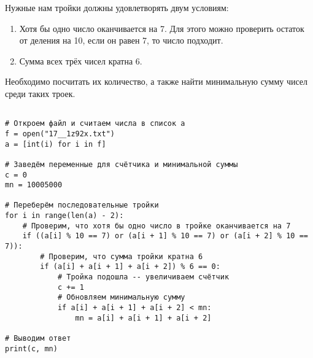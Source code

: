 \documentclass[14pt,a4paper]{article}
\begin{document}
Нужные нам тройки должны удовлетворять двум условиям:
\begin{enumerate}
    \item Хотя бы одно число оканчивается на 7. Для этого можно проверить остаток от деления на 10, если он равен 7, то число подходит. \\
    \item Сумма всех трёх чисел кратна 6. \\
\end{enumerate}
Необходимо посчитать их количество, а также найти минимальную сумму чисел среди таких троек.

\begin{verbatim}

# Откроем файл и считаем числа в список a
f = open("17__1z92x.txt")
a = [int(i) for i in f]

# Заведём переменные для счётчика и минимальной суммы
c = 0
mn = 10005000

# Переберём последовательные тройки
for i in range(len(a) - 2):
    # Проверим, что хотя бы одно число в тройке оканчивается на 7
    if ((a[i] % 10 == 7) or (a[i + 1] % 10 == 7) or (a[i + 2] % 10 == 7)):
        # Проверим, что сумма тройки кратна 6
        if (a[i] + a[i + 1] + a[i + 2]) % 6 == 0:
            # Тройка подошла -- увеличиваем счётчик
            c += 1
            # Обновляем минимальную сумму
            if a[i] + a[i + 1] + a[i + 2] < mn:
                mn = a[i] + a[i + 1] + a[i + 2]

# Выводим ответ
print(c, mn)


\end{verbatim}
\end{document}
